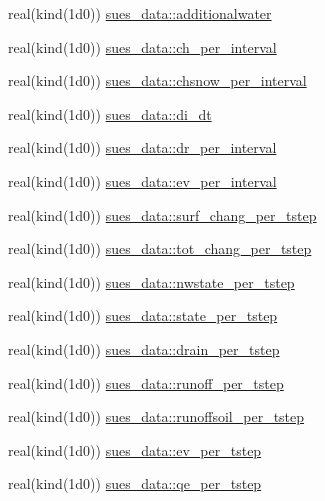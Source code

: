 \begin{DoxyCompactItemize}
\item 
real(kind(1d0)) \hyperlink{namespacesues__data_a2c84a8e635e90b198dc0fd4c93c51ba4}{sues\+\_\+data\+::additionalwater}
\item 
real(kind(1d0)) \hyperlink{namespacesues__data_a79ed0c9098d69fcbc6ad9a95fddaf013}{sues\+\_\+data\+::ch\+\_\+per\+\_\+interval}
\item 
real(kind(1d0)) \hyperlink{namespacesues__data_af62ec721dfd084ec5bce9224750e1330}{sues\+\_\+data\+::chsnow\+\_\+per\+\_\+interval}
\item 
real(kind(1d0)) \hyperlink{namespacesues__data_a6f3357b61d4b1a639e99356c6a49ea6e}{sues\+\_\+data\+::di\+\_\+dt}
\item 
real(kind(1d0)) \hyperlink{namespacesues__data_aad693b9bca68a54522874f01bd0f2a18}{sues\+\_\+data\+::dr\+\_\+per\+\_\+interval}
\item 
real(kind(1d0)) \hyperlink{namespacesues__data_ac9d7bd8852ff457c5d8dd2588910ebf3}{sues\+\_\+data\+::ev\+\_\+per\+\_\+interval}
\item 
real(kind(1d0)) \hyperlink{namespacesues__data_a1848f093a3dd5ebdc1da775e9cda8509}{sues\+\_\+data\+::surf\+\_\+chang\+\_\+per\+\_\+tstep}
\item 
real(kind(1d0)) \hyperlink{namespacesues__data_a82ac11b95b008fb43921aac3b503efad}{sues\+\_\+data\+::tot\+\_\+chang\+\_\+per\+\_\+tstep}
\item 
real(kind(1d0)) \hyperlink{namespacesues__data_a9a093b62067234bd553e776c06ac4df9}{sues\+\_\+data\+::nwstate\+\_\+per\+\_\+tstep}
\item 
real(kind(1d0)) \hyperlink{namespacesues__data_abdb761c4b6b03cace33c5c54eb3607b2}{sues\+\_\+data\+::state\+\_\+per\+\_\+tstep}
\item 
real(kind(1d0)) \hyperlink{namespacesues__data_a96e76d9edd6c97fcdbc8f73047e189f3}{sues\+\_\+data\+::drain\+\_\+per\+\_\+tstep}
\item 
real(kind(1d0)) \hyperlink{namespacesues__data_a15eb03975ee429099b923fc02a2577ca}{sues\+\_\+data\+::runoff\+\_\+per\+\_\+tstep}
\item 
real(kind(1d0)) \hyperlink{namespacesues__data_a3b42551207483efdea0f50bba253afe4}{sues\+\_\+data\+::runoffsoil\+\_\+per\+\_\+tstep}
\item 
real(kind(1d0)) \hyperlink{namespacesues__data_a11bc80be13a121686d39d355d6c98aa9}{sues\+\_\+data\+::ev\+\_\+per\+\_\+tstep}
\item 
real(kind(1d0)) \hyperlink{namespacesues__data_a8506404b27e8b0ded77802f2ab475928}{sues\+\_\+data\+::qe\+\_\+per\+\_\+tstep}

\end{DoxyCompactItemize}
